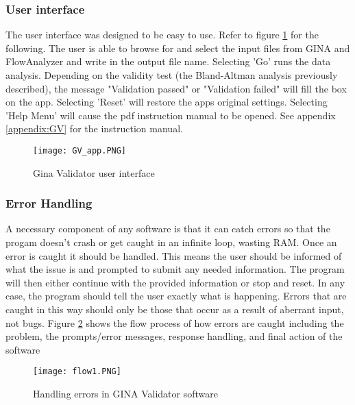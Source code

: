 \documentclass[12pt, openany, oneside]{book}
\begin{document}
\subsubsection{User interface}
The user interface was designed to be easy to use. Refer to figure \ref{fig:gvgui} for the following. The user is able to browse for and select the input files from GINA and FlowAnalyzer and write in the output file name. Selecting 'Go' runs the data analysis. Depending on the validity test (the Bland-Altman analysis previously described), the message "Validation passed" or "Validation failed" will fill the box on the app. Selecting 'Reset' will restore the apps original settings. Selecting 'Help Menu' will cause the pdf instruction manual to be opened. See appendix \ref{appendix:GV} for the instruction manual.

\begin{figure}
\begin{center}	
		\texttt{[image: GV\_app.PNG]}	
		\caption{Gina Validator user interface}
		\label{fig:gvgui}		
	\end{center}

\end{figure}

\subsubsection{Error Handling}
A necessary component of any software is that it can catch errors so that the progam doesn't crash or get caught in an infinite loop, wasting RAM. Once an error is caught it should be handled. This means the user should be informed of what the issue is and prompted to submit any needed information. The program will then either continue with the provided information or stop and reset. In any case, the program should tell the user exactly what is happening. Errors that are caught in this way should only be those that occur as a result of aberrant input, not bugs. Figure \ref{fig:flow1} shows the flow process of how errors are caught including the problem, the prompts/error messages, response handling, and final action of the software

\begin{landscape}
\begin{figure}
	\centering
		\texttt{[image: flow1.PNG]}		
		\caption{Handling errors in GINA Validator software}
		\label{fig:flow1}
\end{figure}
\end{landscape}
\end{document}
